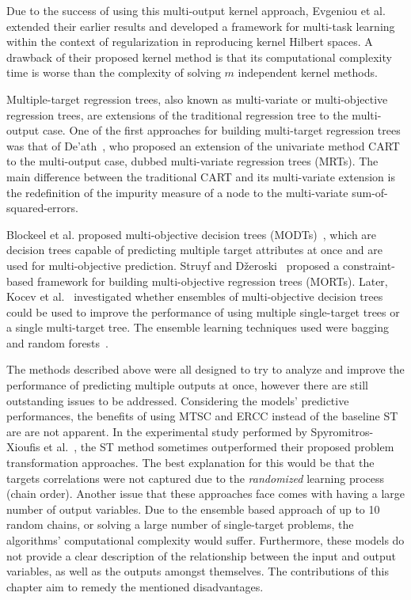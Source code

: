 \documentclass[reqno]{vcuthesis}
\numberwithin{equation}{chapter}
\begin{document}
Due to the success of using this multi-output kernel approach, Evgeniou et al.~\cite{Evgeniou2005} extended their earlier results and developed a framework for multi-task learning within the context of regularization in reproducing kernel Hilbert spaces. A drawback of their proposed kernel method is that its computational complexity time is worse than the complexity of solving $m$ independent kernel methods.

Multiple-target regression trees, also known as multi-variate or multi-objective regression trees, are extensions of the traditional regression tree to the multi-output case. One of the first approaches for building multi-target regression trees was that of De'ath~\cite{de2002multivariate}, who proposed an extension of the univariate method CART~\cite{breiman1984classification} to the multi-output case, dubbed multi-variate regression trees (MRTs). The main difference between the traditional CART and its multi-variate extension is the redefinition of the impurity measure of a node to the multi-variate sum-of-squared-errors.

Blockeel et al. proposed multi-objective decision trees (MODTs)~\cite{blockeel1998top,kocev2009using}, which are decision trees capable of predicting multiple target attributes at once and are used for multi-objective prediction. Struyf and D{\v{z}}eroski~\cite{struyf2005constraint} proposed a constraint-based framework for building multi-objective regression trees (MORTs). Later, Kocev et al.~\cite{Kocev2007} investigated whether ensembles of multi-objective decision trees could be used to improve the performance of using multiple single-target trees or a single multi-target tree. The ensemble learning techniques used were bagging~\cite{Breiman1996} and random forests~\cite{breiman2001random}.

The methods described above were all designed to try to analyze and improve the performance of predicting multiple outputs at once, however there are still outstanding issues to be addressed. Considering the models' predictive performances, the benefits of using MTSC and ERCC instead of the baseline ST are are not apparent. In the experimental study performed by Spyromitros-Xioufis et al.~\cite{Spyromitros2014}, the ST method sometimes outperformed their proposed problem transformation approaches. The best explanation for this would be that the targets correlations were not captured due to the \textit{randomized} learning process (chain order). Another issue that these approaches face comes with having a large number of output variables. Due to the ensemble based approach of up to 10 random chains, or solving a large number of single-target problems, the algorithms' computational complexity would suffer. Furthermore, these models do not provide a clear description of the relationship between the input and output variables, as well as the outputs amongst themselves. The contributions of this chapter aim to remedy the mentioned disadvantages.
\end{document}
